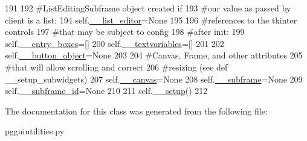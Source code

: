 \begin{DoxyCode}
191 
192         \textcolor{comment}{#ListEditingSubframe object created if}
193         \textcolor{comment}{#our value as passed by client is a list:}
194         self.\hyperlink{classnegui_1_1pgguiutilities_1_1KeyValFrame_a7c41f848553b931f4d4410746f536e80}{\_\_list\_editor}=\textcolor{keywordtype}{None}
195 
196         \textcolor{comment}{#references to the tkinter controls}
197         \textcolor{comment}{#that may be subject to config}
198         \textcolor{comment}{#after init:}
199         self.\hyperlink{classnegui_1_1pgguiutilities_1_1KeyValFrame_aca02061228a06555b1089c0f29e76c16}{\_\_entry\_boxes}=[]
200         self.\hyperlink{classnegui_1_1pgguiutilities_1_1KeyValFrame_a4c7f885ec8170c01e0518a3ce9f83825}{\_\_textvariables}=[]
201 
202         self.\hyperlink{classnegui_1_1pgguiutilities_1_1KeyValFrame_a81a445bf0dde094f7a637862633f326d}{\_\_button\_object}=\textcolor{keywordtype}{None}
203 
204         \textcolor{comment}{#Canvas, Frame, and other attributes}
205         \textcolor{comment}{#that will allow scrolling and correct}
206         \textcolor{comment}{#resizing (see def \_\_setup\_subwidgets)}
207         self.\hyperlink{classnegui_1_1pgguiutilities_1_1KeyValFrame_a84a06231bb7ea897130918df961a8b7a}{\_\_canvas}=\textcolor{keywordtype}{None}
208         self.\hyperlink{classnegui_1_1pgguiutilities_1_1KeyValFrame_a235e50f36bb184384f5890419a5fbe6b}{\_\_subframe}=\textcolor{keywordtype}{None}
209         self.\hyperlink{classnegui_1_1pgguiutilities_1_1KeyValFrame_a142189024bf58f59618aa83128270459}{\_\_subframe\_id}=\textcolor{keywordtype}{None}
210         
211         self.\hyperlink{classnegui_1_1pgguiutilities_1_1KeyValFrame_a9d6430a9f908364c1f00e07b47dcbff5}{\_\_setup}()
212 
\end{DoxyCode}


The documentation for this class was generated from the following file\+:\begin{DoxyCompactItemize}
\item 
pgguiutilities.\+py\end{DoxyCompactItemize}
